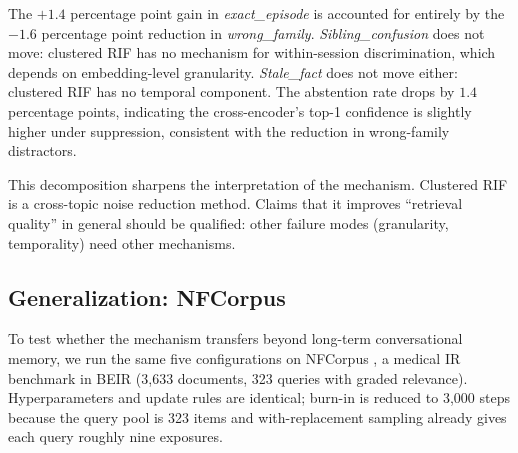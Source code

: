 \documentclass[11pt,a4paper]{article}
\begin{document}
The $+1.4$ percentage point gain in \emph{exact\_episode} is accounted for entirely by the $-1.6$ percentage point reduction in \emph{wrong\_family}. \emph{Sibling\_confusion} does not move: clustered RIF has no mechanism for within-session discrimination, which depends on embedding-level granularity. \emph{Stale\_fact} does not move either: clustered RIF has no temporal component. The abstention rate drops by $1.4$ percentage points, indicating the cross-encoder's top-1 confidence is slightly higher under suppression, consistent with the reduction in wrong-family distractors.

This decomposition sharpens the interpretation of the mechanism. Clustered RIF is a cross-topic noise reduction method. Claims that it improves ``retrieval quality'' in general should be qualified: other failure modes (granularity, temporality) need other mechanisms.

\subsection{Generalization: NFCorpus}
\label{sec:nfcorpus}

To test whether the mechanism transfers beyond long-term conversational memory, we run the same five configurations on NFCorpus \citep{boteva2016nfcorpus}, a medical IR benchmark in BEIR (3,633 documents, 323 queries with graded relevance). Hyperparameters and update rules are identical; burn-in is reduced to 3,000 steps because the query pool is 323 items and with-replacement sampling already gives each query roughly nine exposures.
\end{document}
